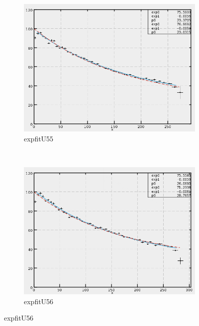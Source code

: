 \begin{figure}[h]
    \centering
    \begin{subfigure}[h]{0.44\textwidth}
        \centering
        \includegraphics[width=\textwidth, keepaspectratio = true]{expfit_U55}
        \caption{expfitU55}
        \label{fig:expfit_U55}
    \end{subfigure}
    ~
    \begin{subfigure}[h]{0.44\textwidth}
        \centering
        \includegraphics[width=\textwidth, keepaspectratio = true]{expfit_U56}
        \caption{expfitU56}
        \label{fig:expfit_U56}
    \end{subfigure}
    

\end{figure}
